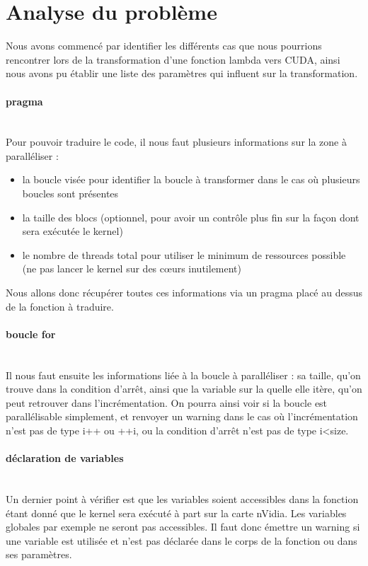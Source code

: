 \documentclass{article}
\begin{document}
	
	\section{Analyse du problème}
	Nous avons commencé par identifier les différents cas que nous pourrions rencontrer lors de la transformation d'une fonction lambda vers CUDA, ainsi nous avons pu établir une liste des paramètres qui influent sur la transformation.
	
	\paragraph{pragma}
	~~\\
	\indent
	Pour pouvoir traduire le code, il nous faut plusieurs informations sur la zone à paralléliser : 
	\begin{itemize}
		\item la boucle visée pour identifier la boucle à transformer dans le cas où plusieurs boucles sont présentes
		\item la taille des blocs (optionnel, pour avoir un contrôle plus fin sur la façon dont sera exécutée le kernel)
		\item le nombre de threads total pour utiliser le minimum de ressources possible (ne pas lancer le kernel sur des cœurs inutilement)
	\end{itemize}		
	Nous allons donc récupérer toutes ces informations via un pragma placé au dessus de la fonction à traduire.
	
	\paragraph{boucle for}
	~~\\
	\indent
	Il nous faut ensuite les informations liée à la boucle à paralléliser : sa taille, qu'on trouve dans la condition d'arrêt, ainsi que la variable sur la quelle elle itère, qu'on peut retrouver dans l'incrémentation. On pourra ainsi voir si la boucle est parallélisable simplement, et renvoyer un warning dans le cas où l'incrémentation n'est pas de type i++ ou ++i, ou la condition d'arrêt n'est pas de type i\textless size.	
	
	\paragraph{déclaration de variables}
	~~\\
	\indent
	Un dernier point à vérifier est que les variables soient accessibles dans la fonction étant donné que le kernel sera exécuté à part sur la carte nVidia. Les variables globales par exemple ne seront pas accessibles. Il faut donc émettre un warning si une variable est utilisée et n'est pas déclarée dans le corps de la fonction ou dans ses paramètres.
	
\end{document}
